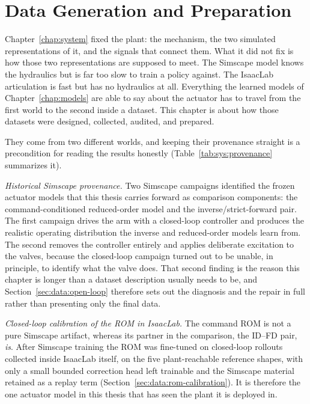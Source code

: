 \chapter{Data Generation and Preparation}
\label{chap:data}

Chapter~\ref{chap:system} fixed the plant: the mechanism, the two
simulated representations of it, and the signals that connect them. What
it did not fix is how those two representations are supposed to meet.
The Simscape model knows the hydraulics but is far too slow to train a
policy against. The IsaacLab articulation is fast but has no hydraulics
at all. Everything the learned models of Chapter~\ref{chap:models} are
able to say about the actuator has to travel from the first world to the
second inside a dataset. This chapter is about how those datasets were
designed, collected, audited, and prepared.

They come from two different worlds, and keeping their provenance
straight is a precondition for reading the results honestly
(Table~\ref{tab:sys:provenance} summarizes it).

\emph{Historical Simscape provenance.} Two Simscape campaigns identified
the frozen actuator models that this thesis carries forward as
comparison components: the command-conditioned reduced-order model and
the inverse/strict-forward pair. The first campaign drives the arm with
a closed-loop controller and produces the realistic operating
distribution the inverse and reduced-order models learn from. The second
removes the controller entirely and applies deliberate excitation to the
valves, because the closed-loop campaign turned out to be unable, in
principle, to identify what the valve does. That second finding is the
reason this chapter is longer than a dataset description usually needs
to be, and Section~\ref{sec:data:open-loop} therefore sets out the diagnosis and the
repair in full rather than presenting only the final data.

\emph{Closed-loop calibration of the ROM in IsaacLab.} The command ROM is not a pure Simscape artifact, whereas its partner in
the comparison, the ID--FD pair, \emph{is}. After
Simscape training the ROM was fine-tuned on closed-loop rollouts
collected inside IsaacLab itself, on the five plant-reachable reference
shapes, with only a small bounded correction head left trainable and the
Simscape material retained as a replay term
(Section~\ref{sec:data:rom-calibration}). It is therefore the one
actuator model in this thesis that has seen the plant it is deployed in.

